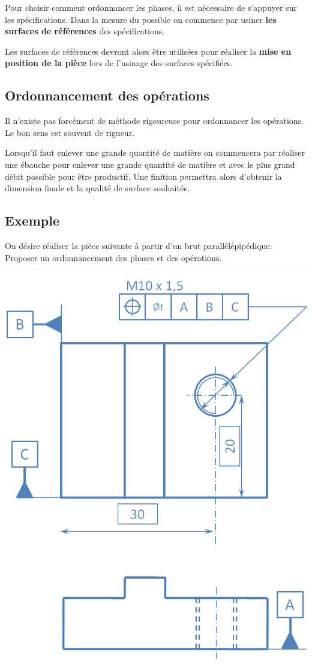 \documentclass[11pt,oneside]{article}
\begin{document}
%
 
\begin{methode}
Pour choisir comment ordonnancer les phases, il est nécessaire de s'appuyer sur les spécifications.  Dans la mesure du possible on commence par usiner \textbf{les surfaces de références} des spécifications.

Les surfaces de références devront alors être utilisées pour réaliser la \textbf{mise en position de la pièce} lors de l'usinage des surfaces spécifiées.
\end{methode}


\subsection{Ordonnancement des opérations}
Il n'existe pas forcément de méthode rigoureuse pour ordonnancer les opérations. Le bon sens est souvent de rigueur. 

Lorsqu'il faut enlever une grande quantité de matière on commencera par réaliser une ébauche pour enlever une grande quantité de matière et avec le plus grand débit possible pour être productif. Une finition permettra alors d'obtenir la dimension finale et la qualité de surface souhaitée.
\subsection{Exemple}

On désire réaliser la pièce suivante à partir d'un brut parallélépipédique. Proposer un ordonnancement des phases et des opérations.
\begin{center}
\includegraphics[width=.5\textwidth]{png/exemple_gamme}


\end{center}
\end{document}
